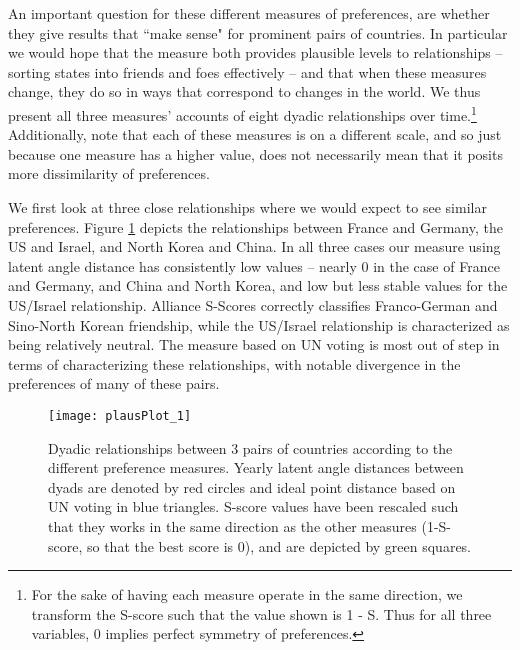 An important question for these different measures of preferences, are whether they give results that ``make sense" for prominent pairs of countries. In particular we would hope that the measure both provides plausible levels to relationships -- sorting states into friends and foes effectively -- and that when these measures change, they do so in ways that correspond to changes in the world. We thus present all three measures' accounts of eight dyadic relationships over time.\footnote{For the sake of having each measure operate in the same direction, we transform the S-score such that the value shown is 1 - S. Thus for all three variables, $0$ implies perfect symmetry of preferences.} Additionally, note that each of these measures is on a different scale, and so just because one measure has a higher value, does not necessarily mean that it posits more dissimilarity of preferences.

We first look at three close relationships where we would expect to see similar preferences. Figure \ref{friendly:dyads} depicts the relationships between France and Germany, the US and Israel, and North Korea and China. In all three cases our measure using latent angle distance has consistently low values -- nearly $0$ in the case of France and Germany, and China and North Korea, and low but less stable values for the US/Israel relationship. Alliance S-Scores correctly classifies Franco-German and Sino-North Korean friendship, while the US/Israel relationship is characterized as being relatively neutral. The measure based on UN voting is most out of step in terms of characterizing these relationships, with notable divergence in the preferences of many of these pairs.

\begin{figure}
	\centering
	\texttt{[image: plausPlot\_1]}
	\caption{Dyadic relationships between 3 pairs of countries according to the different preference measures. Yearly latent angle distances between dyads are denoted by red circles and ideal point distance based on UN voting in blue triangles. S-score values have been rescaled such that they works in the same direction as the other measures (1-S-score, so that the best score is 0), and are depicted by green squares.}
	\label{friendly:dyads}
\end{figure}

